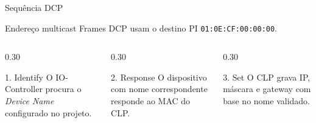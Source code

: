 \documentclass[10pt, aspectratio=169]{beamer}
\begin{document}
\begin{frame}{Sequ\^encia DCP}
    \small
    \begin{block}{Endere\c{c}o multicast}
        Frames DCP usam o destino PI \texttt{01:0E:CF:00:00:00}.
    \end{block}

    \begin{columns}[T,totalwidth=\textwidth]
        \begin{column}{0.30\textwidth}
            \begin{block}{1. Identify}
                O IO-Controller procura o \textit{Device Name} configurado no projeto.
            \end{block}
        \end{column}
        \begin{column}{0.30\textwidth}
            \begin{block}{2. Response}
                O dispositivo com nome correspondente responde ao MAC do CLP.
            \end{block}
        \end{column}
        \begin{column}{0.30\textwidth}
            \begin{block}{3. Set}
                O CLP grava IP, m\'ascara e gateway com base no nome validado.
            \end{block}
        \end{column}
    \end{columns}
\end{frame}
\end{document}
